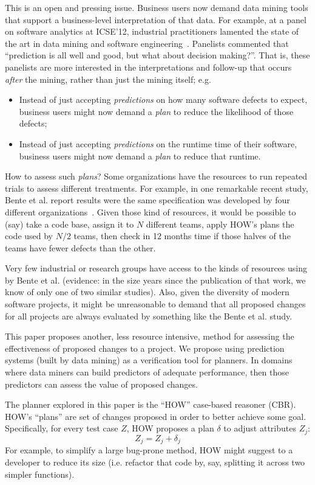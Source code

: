 \documentclass[conference]{IEEEtran}
\newcommand{\bi}{\begin{itemize}}
\newcommand{\ei}{\end{itemize}}
\begin{document}
This is an open and pressing issue.
Business  users   now demand   data mining tools
that  support a  business-level
interpretation of that data. For example,
at a  panel on software analytics at ICSE'12,
industrial practitioners lamented the state of the art in data mining
and software engineering~\cite{menzies12a}. Panelists commented that
``prediction is all well and good, but what about decision
making?''. That is, these panelists are more interested in the interpretations
and follow-up
that occurs {\em after} the mining, rather than just  the mining itself; e.g.
\bi
\item 
Instead of just accepting  {\em predictions} on how many 
 software defects
to expect,  business users might now demand a {\em plan} to
reduce the likelihood of those defects;
\item Instead of just accepting {\em predictions} on the runtime
time of their software, business users might now demand
a {\em plan} to reduce that runtime.
\ei
How to assess such {\em plans}?
Some organizations have the resources to 
run repeated trials to assess  different treatments.
For example, in one remarkable recent study, Bente et al. report results
were the same specification was developed  by four different organizations~\cite{Anda2009}. Given those kind of resources, it would be possible
to (say) take a code base, assign it to $N$ different teams, apply
HOW's plans the code used by  $N/2$ teams, then check in 12 months time
if those halves of the teams have fewer defects than the other.  

Very few industrial or research groups have access
to the kinds of resources using by Bente et al. (evidence: in the size years since the
publication of that work, we know of only one of two similar studies). Also, given the
diversity of modern software projects, it might be unreasonable to demand that all
proposed changes for all projects are always evaluated by something like the Bente et al. study.

This paper proposes another, less resource intensive,  method for assessing the effectiveness of proposed
changes to a project.  
We propose using prediction systems (built by data mining) as a verification
tool for planners. In domains where  data miners can build
predictors of adequate performance, then those predictors can assess the value
of proposed changes.
 
The planner explored in this paper is the ``HOW'' case-based reasoner (CBR).
HOW's  ``plans'' are  set of changes
proposed  in order to better achieve some goal. 
Specifically, for every test case $Z$, HOW proposes a  plan $\delta$ to
  adjust   attributes $Z_j$:
\begin{equation}\label{eq:one}
Z_j = Z_j + \delta_j
\end{equation}
For example, to simplify a  large bug-prone  method, HOW might suggest
to a developer to reduce its size (i.e.  refactor that code by, say, splitting it across
two simpler functions).
\end{document}
